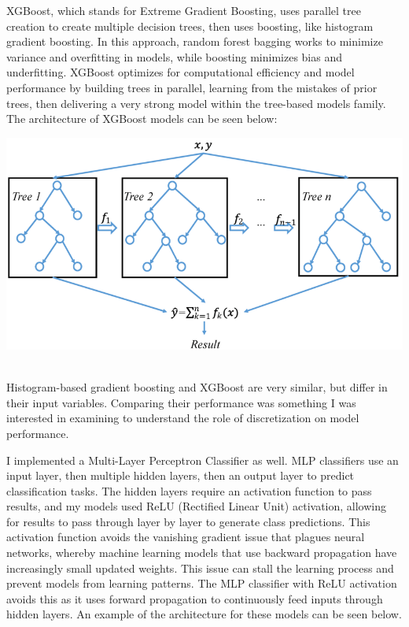 \documentclass{article}
\begin{document}
XGBoost, which stands for Extreme Gradient Boosting, uses parallel tree creation to create multiple decision trees, then uses boosting, like histogram gradient boosting. In this approach, random forest bagging works to minimize variance and overfitting in models, while boosting minimizes bias and underfitting. XGBoost optimizes for computational efficiency and model performance by building trees in parallel, learning from the mistakes of prior trees, then delivering a very strong model within the tree-based models family. The architecture of XGBoost models can be seen below: 

\begin{center}
    \includegraphics[scale = .25]{images/XGBOOST.png}
    ~\cite{xgboost}
\end{center}

Histogram-based gradient boosting and XGBoost are very similar, but differ in their input variables. Comparing their performance was something I was interested in examining to understand the role of discretization on model performance. 

I implemented a Multi-Layer Perceptron Classifier as well. MLP classifiers use an input layer, then multiple hidden layers, then an output layer to predict classification tasks. The hidden layers require an activation function to pass results, and my models used ReLU (Rectified Linear Unit) activation, allowing for results to pass through layer by layer to generate class predictions. This activation function avoids the vanishing gradient issue that plagues neural networks, whereby machine learning models that use backward propagation have increasingly small updated weights. This issue can stall the learning process and prevent models from learning patterns. The MLP classifier with ReLU activation avoids this as it uses forward propagation to continuously feed inputs through hidden layers. An example of the architecture for these models can be seen below. 
\end{document}
